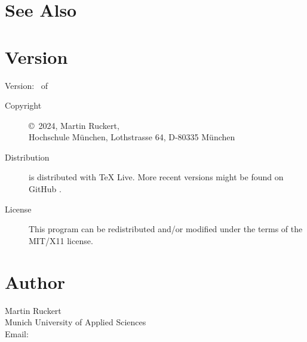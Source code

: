 \documentclass[a4paper,english]{article}
\begin{document}
\section{See Also}


\section{Version}
Version: \Version\  of \Date
\begin{description}
\item[Copyright] \copyright\ 2024, Martin Ruckert,\\
     Hochschule München, Lothstrasse 64, D-80335 München

\item[Distribution]
   is distributed with TeX Live.
  More recent versions might be found on GitHub
  .

\item[License] This program can be redistributed and/or modified under the
  terms of the MIT/X11 license.
\end{description}

\section{Author}
\noindent
Martin Ruckert                        \\
Munich University of Applied Sciences \\
Email:   \\
\end{document}
